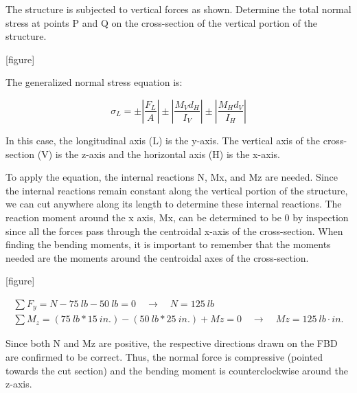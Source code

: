 \documentclass[
  letterpaper,
  DIV=11,
  numbers=noendperiod]{scrreprt}
\theoremstyle{definition}
\theoremstyle{remark}
\begin{document}
\begin{tcolorbox}[enhanced jigsaw, leftrule=.75mm, colbacktitle=quarto-callout-tip-color!10!white, breakable, opacityback=0, colback=white, titlerule=0mm, toprule=.15mm, colframe=quarto-callout-tip-color-frame, coltitle=black, title={Example 14.2}, toptitle=1mm, bottomrule=.15mm, rightrule=.15mm, left=2mm, arc=.35mm, opacitybacktitle=0.6, bottomtitle=1mm]

The structure is subjected to vertical forces as shown. Determine the
total normal stress at points P and Q on the cross-section of the
vertical portion of the structure.

{[}figure{]}

\begin{tcolorbox}[enhanced jigsaw, leftrule=.75mm, colbacktitle=quarto-callout-tip-color!10!white, breakable, opacityback=0, colback=white, titlerule=0mm, toprule=.15mm, colframe=quarto-callout-tip-color-frame, coltitle=black, title={Solution}, toptitle=1mm, bottomrule=.15mm, rightrule=.15mm, left=2mm, arc=.35mm, opacitybacktitle=0.6, bottomtitle=1mm]

The generalized normal stress equation is:

\[
\sigma_L= \pm\left|\frac{F_L}{A}\right| \pm\left|\frac{M_V d_H}{I_V}\right| \pm\left|\frac{M_H d_V}{I_H}\right|
\]

In this case, the longitudinal axis (L) is the y-axis. The vertical axis
of the cross-section (V) is the z-axis and the horizontal axis (H) is
the x-axis.

To apply the equation, the internal reactions N, Mx, and Mz are needed.
Since the internal reactions remain constant along the vertical portion
of the structure, we can cut anywhere along its length to determine
these internal reactions. The reaction moment around the x axis, Mx, can
be determined to be 0 by inspection since all the forces pass through
the centroidal x-axis of the cross-section. When finding the bending
moments, it is important to remember that the moments needed are the
moments around the centroidal axes of the cross-section.

{[}figure{]}

\[
\begin{gathered}
\sum F_y=N-75{~lb}-50{~lb}=0 \quad\rightarrow\quad N=125{~lb} \\
\sum M_z=(75{~lb}*15{~in.})-(50{~lb}*25{~in.})+M z=0 \quad\rightarrow\quad M z=125{~lb}\cdot{in.}
\end{gathered}
\]

Since both N and Mz are positive, the respective directions drawn on the
FBD are confirmed to be correct. Thus, the normal force is compressive
(pointed towards the cut section) and the bending moment is
counterclockwise around the z-axis.


\end{tcolorbox}
\end{tcolorbox}
\end{document}
